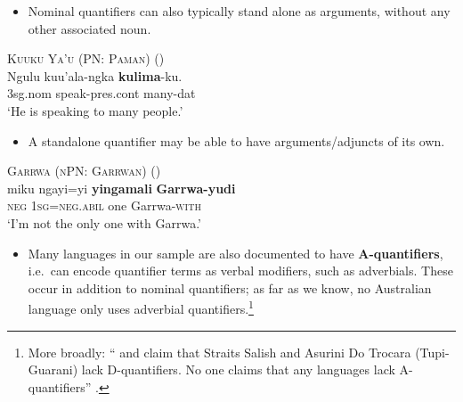 \documentclass{article}
\begin{document}
\begin{itemize}
\item Nominal quantifiers can also typically stand alone as arguments, without any other associated noun. %
\end{itemize}

\begin{exe}
  \ex \textsc{Kuuku Ya'u (PN: Paman)} (\citealt[15]{thompson88})\\
  \gll Ngulu         kuu'ala-ngka           \textbf{kulima}-ku.\\
  3{\sc sg.nom} speak-{\sc pres.cont} many-{\sc dat}\\
  \glt `He is speaking to many people.'
\end{exe}

\begin{itemize}
\item A standalone quantifier may be able to have arguments/adjuncts of its own.
\end{itemize}
\begin{exe}
  \ex \textsc{Garrwa (nPN: Garrwan)} (\citealt[53]{mushin12})\\
  \gll miku ngayi=yi \textbf{yingamali} \textbf{Garrwa-yudi}\\
  \textsc{neg} 1\textsc{sg}=\textsc{neg.abil} one Garrwa-\textsc{with}\\
  \glt `I'm not the only one with Garrwa.'
\end{exe}

\begin{itemize}
\item Many languages in our sample are also documented to have \textbf{A-quantifiers}, i.e.\ can encode quantifier terms as verbal modifiers, such as adverbials. These occur in addition to nominal quantifiers; as far as we know, no Australian language only uses adverbial quantifiers.\footnote{More broadly: ``\citealt{jelinek95} and \citealt{vieira95} claim that Straits Salish and Asurini Do Trocara (Tupi-Guarani) lack D-quantifiers. No one claims that any languages lack A-quantifiers'' \citep[2]{keenan17qu}.}
\end{itemize}
\end{document}
